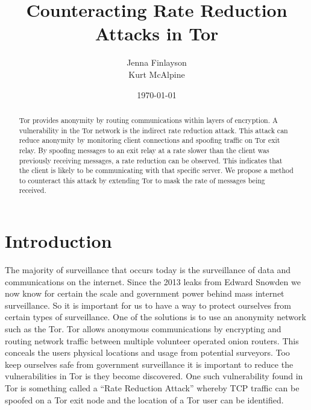 \documentclass{report}
\title{Counteracting Rate Reduction Attacks in Tor}
\date{\today}
\author{Jenna Finlayson\\Kurt McAlpine}
\begin{document}
\maketitle

\begin{abstract}
Tor provides anonymity by routing communications within layers of encryption. A
vulnerability in the Tor network is the indirect rate reduction attack. This
attack can reduce anonymity by monitoring client connections and spoofing
traffic on Tor exit relay. By spoofing messages to an exit relay at a rate
slower than the client was previously receiving messages, a rate reduction can
be observed. This indicates that the client is likely to be communicating with
that specific server. We propose a method to counteract this attack by
extending Tor to mask the rate of messages being received.
\end{abstract}

\section{Introduction}

The majority of surveillance that occurs today is the surveillance of data and
communications on the internet\cite{diffie2008brave}. Since the 2013 leaks from
Edward Snowden we now know for certain the scale and government power behind
mass internet surveillance. So it is important for us to have a way to protect
ourselves from certain types of surveillance. One of the solutions is to use an
anonymity network such as the Tor. Tor allows anonymous communications by
encrypting and routing network traffic between multiple volunteer operated
onion routers. This conceals the users physical locations and usage from
potential surveyors. Too keep ourselves safe from government surveillance it is
important to reduce the vulnerabilities in Tor is they become discovered. One
such vulnerability found in Tor is something called a ``Rate Reduction Attack''
whereby TCP traffic can be spoofed on a Tor exit node and the location of a Tor
user can be identified\cite{gilad2012spying}.




\end{document}
